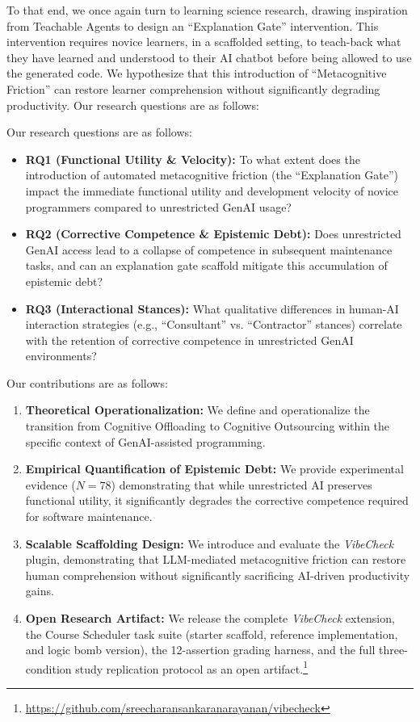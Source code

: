 \documentclass[sigconf]{acmart}
\begin{document}
To that end, we once again turn to learning science research, drawing inspiration from Teachable Agents \cite{biswas2005} to design an ``Explanation Gate'' intervention. This intervention requires novice learners, in a scaffolded setting, to teach-back what they have learned and understood to their AI chatbot before being allowed to use the generated code. We hypothesize that this introduction of ``Metacognitive Friction'' can restore learner comprehension without significantly degrading productivity. Our research questions are as follows:

Our research questions are as follows:

\begin{itemize}
    \item \textbf{RQ1 (Functional Utility \& Velocity):} To what extent does the introduction of automated metacognitive friction (the ``Explanation Gate'') impact the immediate functional utility and development velocity of novice programmers compared to unrestricted GenAI usage?
    \item \textbf{RQ2 (Corrective Competence \& Epistemic Debt):} Does unrestricted GenAI access lead to a collapse of competence in subsequent maintenance tasks, and can an explanation gate scaffold mitigate this accumulation of epistemic debt?
    \item \textbf{RQ3 (Interactional Stances):} What qualitative differences in human-AI interaction strategies (e.g., ``Consultant'' vs. ``Contractor'' stances) correlate with the retention of corrective competence in unrestricted GenAI environments?
\end{itemize}

Our contributions are as follows:
\begin{enumerate}
    \item \textbf{Theoretical Operationalization:} We define and operationalize the transition from Cognitive Offloading to Cognitive Outsourcing within the specific context of GenAI-assisted programming.
    \item \textbf{Empirical Quantification of Epistemic Debt:} We provide experimental evidence ($N=78$) demonstrating that while unrestricted AI preserves functional utility, it significantly degrades the corrective competence required for software maintenance.
    \item \textbf{Scalable Scaffolding Design:} We introduce and evaluate the \textit{VibeCheck} plugin, demonstrating that LLM-mediated metacognitive friction can restore human comprehension without significantly sacrificing AI-driven productivity gains.
    \item \textbf{Open Research Artifact:} We release the complete \textit{VibeCheck} extension, the Course Scheduler task suite (starter scaffold, reference implementation, and logic bomb version), the 12-assertion grading harness, and the full three-condition study replication protocol as an open artifact.\footnote{\url{https://github.com/sreecharansankaranarayanan/vibecheck}}
\end{enumerate}
\end{document}
